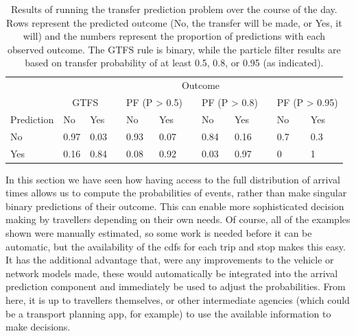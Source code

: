 \begin{knitrout}\small
{}\color{fgcolor}\begin{table}

\caption{\label{tab:eta_journey_transfer_many2}Results of running the transfer prediction problem over the course of the day. Rows represent the predicted outcome (No, the transfer will be made, or Yes, it will) and the numbers represent the proportion of predictions with each observed outcome. The GTFS rule is binary, while the particle filter results are based on transfer probability of at least 0.5, 0.8, or 0.95 (as indicated).}
\centering
\fontsize{8}{10}\selectfont
\begin{tabular}[t]{llllllllllll}
\toprule
\multicolumn{1}{c}{} & \multicolumn{11}{c}{Outcome} \\
\cmidrule(l{3pt}r{3pt}){2-12}
\multicolumn{1}{c}{} & \multicolumn{2}{c}{GTFS} & \multicolumn{1}{c}{} & \multicolumn{2}{c}{PF (P > 0.5)} & \multicolumn{1}{c}{} & \multicolumn{2}{c}{PF (P > 0.8)} & \multicolumn{1}{c}{} & \multicolumn{2}{c}{PF (P > 0.95)} \\
\cmidrule(l{3pt}r{3pt}){2-3} \cmidrule(l{3pt}r{3pt}){5-6} \cmidrule(l{3pt}r{3pt}){8-9} \cmidrule(l{3pt}r{3pt}){11-12}
Prediction & No & Yes &  & No & Yes &  & No & Yes &  & No & Yes\\
\midrule
No & 0.97 & 0.03 &  & 0.93 & 0.07 &  & 0.84 & 0.16 &  & 0.7 & 0.3\\
Yes & 0.16 & 0.84 &  & 0.08 & 0.92 &  & 0.03 & 0.97 &  & 0 & 1\\
\bottomrule
\end{tabular}
\end{table}


\end{knitrout}



In this section we have seen how having access to the full distribution of arrival times allows us to compute the probabilities of events, rather than make singular binary predictions of their outcome. This can enable more sophisticated decision making by travellers depending on their own needs. Of course, all of the examples shown were manually estimated, so some work is needed before it can be automatic, but the availability of the \glspl{cdf} for each trip and stop makes this easy. It has the additional advantage that, were any improvements to the vehicle or network models made, these would automatically be integrated into the arrival prediction component and immediately be used to adjust the probabilities. From here, it is up to travellers themselves, or other intermediate agencies (which could be a transport planning app, for example) to use the available information to make decisions.
